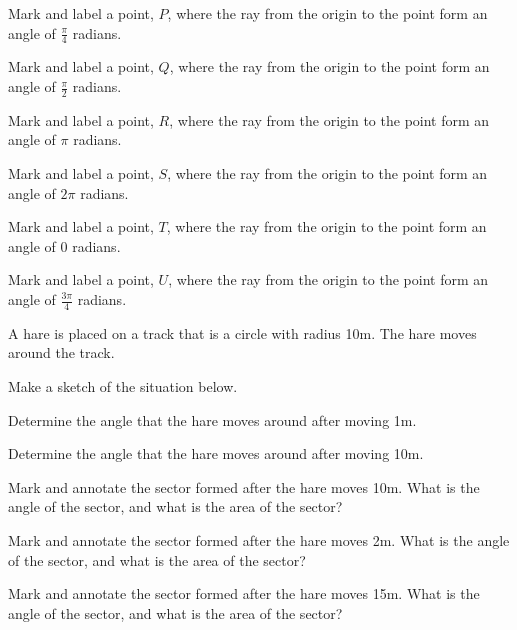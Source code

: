 \begin{problem}
  \begin{subproblem}
  \item Mark and label a point, $P$, where the ray from the origin to
    the point form an angle of $\frac{\pi}{4}$ radians.
  \item Mark and label a point, $Q$, where the ray from the origin to
    the point form an angle of $\frac{\pi}{2}$ radians.
  \item Mark and label a point, $R$, where the ray from the origin to
    the point form an angle of $\pi$ radians.
  \item Mark and label a point, $S$, where the ray from the origin to
    the point form an angle of $2\pi$ radians.
  \item Mark and label a point, $T$, where the ray from the origin to
    the point form an angle of $0$ radians.
  \item Mark and label a point, $U$, where the ray from the origin to
    the point form an angle of $\frac{3\pi}{4}$ radians.
  \end{subproblem}

  \clearpage

\item A hare is placed on a track that is a circle with radius
  10m. The hare moves around the track.
  \begin{subproblem}
  \item Make a sketch of the situation below.
    \vfill

  \item Determine the angle that the hare moves around after moving
    1m.   
    \vfill

  \item Determine the angle that the hare moves around after moving 10m.
    \vfill

  \item Mark and annotate the sector formed after the hare moves
    10m. What is the angle of the sector, and what is the area of the
    sector?
    \vfill

  \item Mark and annotate the sector formed after the hare moves
    2m. What is the angle of the sector, and what is the area of the
    sector?
    \vfill
  \item Mark and annotate the sector formed after the hare moves
    15m. What is the angle of the sector, and what is the area of the
    sector?
    \vfill
  \end{subproblem}


\end{problem}
